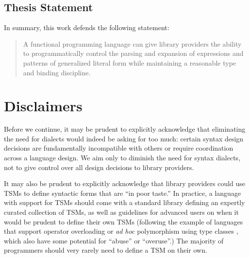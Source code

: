 \subsection*{Thesis Statement}
In summary, this work defends the following statement:

\begin{quote}
A functional programming language can give library providers the ability to %
programmatically control the parsing and expansion of expressions and patterns of generalized literal form while maintaining a reasonable type and binding discipline. %
\end{quote}
\section{Disclaimers}
Before we continue, it may be prudent to explicitly acknowledge that eliminating the need for dialects would indeed be asking for too much: certain syntax design decisions are fundamentally incompatible with others or require coordination across a language design. We aim only to diminish the need for syntax dialects, not to give control over all design decisions to library providers. %

It may also be prudent to explicitly acknowledge that library providers could use TSMs  to define syntactic forms that are ``in poor taste.'' In practice, a language with support for TSMs should come with a standard library defining an expertly curated collection of TSMs, as well as guidelines for advanced users on when it would be prudent to define their own TSMs (following the example of languages that support operator overloading or \emph{ad hoc} polymorphism using type classes \cite{Hall:1996:TCH:227699.227700,conf/popl/DreyerHCK07}, which also have some potential for ``abuse'' or ``overuse''.) %
The majority of programmers should very rarely need to define a TSM on their own.

